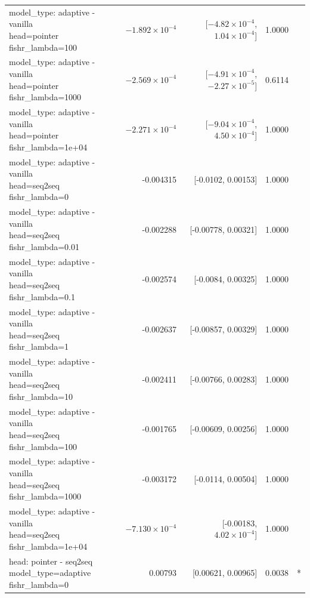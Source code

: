 \documentclass[10pt]{article}
\makeatletter
\newcommand{\stackcell}[1]{\begin{tabular}[t]{@{}l@{}}#1\end{tabular}}
\makeatother
\begin{document}
{\begin{longtable}{lrrrl}
\stackcell{model\_type: adaptive - vanilla\\\footnotesize head=pointer fishr\_lambda=100 } & $-1.892\times10^{-4}$ & [$-4.82\times10^{-4}$, $1.04\times10^{-4}$] & 1.0000 & \\
\stackcell{model\_type: adaptive - vanilla\\\footnotesize head=pointer fishr\_lambda=1000 } & $-2.569\times10^{-4}$ & [$-4.91\times10^{-4}$, $-2.27\times10^{-5}$] & 0.6114 & \\
\stackcell{model\_type: adaptive - vanilla\\\footnotesize head=pointer fishr\_lambda=1e+04 } & $-2.271\times10^{-4}$ & [$-9.04\times10^{-4}$, $4.50\times10^{-4}$] & 1.0000 & \\
\stackcell{model\_type: adaptive - vanilla\\\footnotesize head=seq2seq fishr\_lambda=0 } & -0.004315 & [-0.0102, 0.00153] & 1.0000 & \\
\stackcell{model\_type: adaptive - vanilla\\\footnotesize head=seq2seq fishr\_lambda=0.01 } & -0.002288 & [-0.00778, 0.00321] & 1.0000 & \\
\stackcell{model\_type: adaptive - vanilla\\\footnotesize head=seq2seq fishr\_lambda=0.1 } & -0.002574 & [-0.0084, 0.00325] & 1.0000 & \\
\stackcell{model\_type: adaptive - vanilla\\\footnotesize head=seq2seq fishr\_lambda=1 } & -0.002637 & [-0.00857, 0.00329] & 1.0000 & \\
\stackcell{model\_type: adaptive - vanilla\\\footnotesize head=seq2seq fishr\_lambda=10 } & -0.002411 & [-0.00766, 0.00283] & 1.0000 & \\
\stackcell{model\_type: adaptive - vanilla\\\footnotesize head=seq2seq fishr\_lambda=100 } & -0.001765 & [-0.00609, 0.00256] & 1.0000 & \\
\stackcell{model\_type: adaptive - vanilla\\\footnotesize head=seq2seq fishr\_lambda=1000 } & -0.003172 & [-0.0114, 0.00504] & 1.0000 & \\
\stackcell{model\_type: adaptive - vanilla\\\footnotesize head=seq2seq fishr\_lambda=1e+04 } & $-7.130\times10^{-4}$ & [-0.00183, $4.02\times10^{-4}$] & 1.0000 & \\
\stackcell{head: pointer - seq2seq\\\footnotesize model\_type=adaptive fishr\_lambda=0 } & 0.00793 & [0.00621, 0.00965] & 0.0038 & *\\

\end{longtable}}
\end{document}
